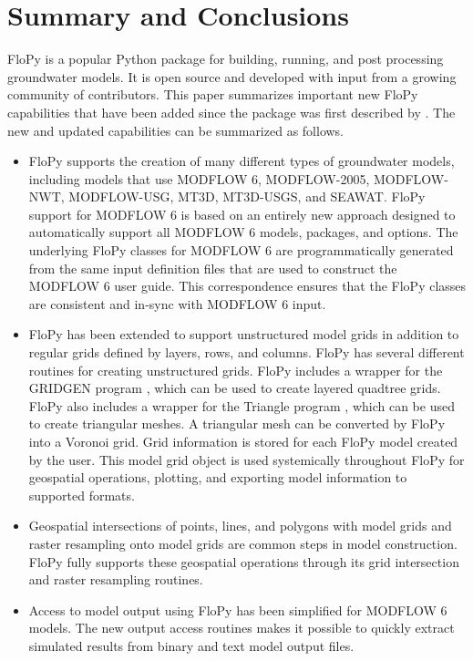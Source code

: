 \documentclass[12pt, oneside]{article}  	%
\begin{document}
\section*{Summary and Conclusions} \label{sec:summary}
FloPy is a popular Python package for building, running, and post processing groundwater models. It is open source and developed with input from a growing community of contributors. This paper summarizes important new FloPy capabilities that have been added since the package was first described by \citep{bakker2016scripting}. The new and updated capabilities can be summarized as follows.

\begin{itemize}
\item FloPy supports the creation of many different types of groundwater models, including models that use MODFLOW 6, MODFLOW-2005, MODFLOW-NWT, MODFLOW-USG, MT3D, MT3D-USGS, and SEAWAT. FloPy support for MODFLOW 6 is based on an entirely new approach designed to automatically support all MODFLOW 6 models, packages, and options. The underlying FloPy classes for MODFLOW 6 are programmatically generated from the same input definition files that are used to construct the MODFLOW 6 user guide. This correspondence ensures that the FloPy classes are consistent and in-sync with MODFLOW 6 input.

\item FloPy has been extended to support unstructured model grids in addition to regular grids defined by layers, rows, and columns. FloPy has several different routines for creating unstructured grids. FloPy includes a wrapper for the GRIDGEN program \citep{gridgen}, which can be used to create layered quadtree grids. FloPy also includes a wrapper for the Triangle program \citep{trianglemesh}, which can be used to create triangular meshes. A triangular mesh can be converted by FloPy into a Voronoi grid. Grid information is stored for each FloPy model created by the user. This model grid object is used systemically throughout FloPy for geospatial operations, plotting, and exporting model information to supported formats.

\item Geospatial intersections of points, lines, and polygons with model grids and raster resampling onto model grids are common steps in model construction. FloPy fully supports these geospatial operations through its grid intersection and raster resampling routines.

\item Access to model output using FloPy has been simplified for MODFLOW 6 models. The new output access routines makes it possible to quickly extract simulated results from binary and text model output files.


\end{itemize}
\end{document}
